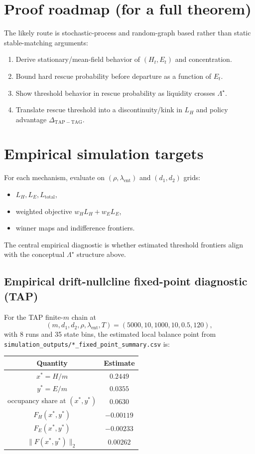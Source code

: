 \documentclass{article}
\begin{document}
\section{Proof roadmap (for a full theorem)}

The likely route is stochastic-process and random-graph based rather than static stable-matching arguments:
\begin{enumerate}
  \item Derive stationary/mean-field behavior of \((H_t,E_t)\) and concentration.
  \item Bound hard rescue probability before departure as a function of \(E_t\).
  \item Show threshold behavior in rescue probability as liquidity crosses \(\Lambda^\star\).
  \item Translate rescue threshold into a discontinuity/kink in \(L_H\) and policy advantage \(\Delta_{\mathrm{TAP}\!-\!\mathrm{TAG}}\).
\end{enumerate}

\section{Empirical simulation targets}

For each mechanism, evaluate on \((\rho,\lambda_{\mathrm{ent}})\) and \((d_1,d_2)\) grids:
\begin{itemize}
  \item \(L_H,L_E,L_{\text{total}}\),
  \item weighted objective \(w_HL_H+w_EL_E\),
  \item winner maps and indifference frontiers.
\end{itemize}

The central empirical diagnostic is whether estimated threshold frontiers align with the conceptual \(\Lambda^\star\) structure above.

\subsection{Empirical drift-nullcline fixed-point diagnostic (TAP)}

For the TAP finite-\(m\) chain at
\[
(m,d_1,d_2,\rho,\lambda_{\mathrm{ent}},T)=(5000,10,1000,10,0.5,120),
\]
with 8 runs and 35 state bins, the estimated local balance point from
\texttt{simulation\_outputs/*\_fixed\_point\_summary.csv} is:
\begin{center}
\begin{tabular}{c|c}
Quantity & Estimate\\\hline
\(x^\ast=H/m\) & \(0.2449\)\\
\(y^\ast=E/m\) & \(0.0355\)\\
occupancy share at \((x^\ast,y^\ast)\) & \(0.0630\)\\
\(F_H(x^\ast,y^\ast)\) & \(-0.00119\)\\
\(F_E(x^\ast,y^\ast)\) & \(-0.00233\)\\
\(\|F(x^\ast,y^\ast)\|_2\) & \(0.00262\)
\end{tabular}
\end{center}
\end{document}
